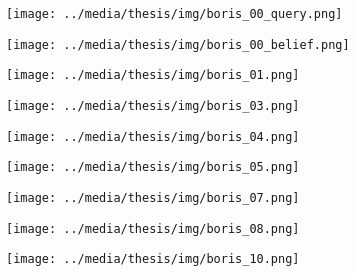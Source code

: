 \begin{figure}[!t]
  \centering
  \begin{subfigure}[t]{0.28\textwidth}
       \texttt{[image: ../media/thesis/img/boris\_00\_query.png]}
       \caption{}\label{fig:07:boris_irene_01}
  \end{subfigure} 
  \quad
  \begin{subfigure}[t]{0.28\textwidth}
     \texttt{[image: ../media/thesis/img/boris\_00\_belief.png]}
     \caption{}\label{fig:07:boris_irene_02}
  \end{subfigure}
  \quad
  \begin{subfigure}[t]{0.28\textwidth}
     \texttt{[image: ../media/thesis/img/boris\_01.png]}
     \caption{}\label{fig:07:boris_irene_03}
  \end{subfigure}
\vspace{2mm}

 \begin{subfigure}[t]{0.28\textwidth}
       \texttt{[image: ../media/thesis/img/boris\_03.png]}
       \caption{}\label{fig:07:rboris_irene_04}
  \end{subfigure} 
  \quad
  \begin{subfigure}[t]{0.28\textwidth}
     \texttt{[image: ../media/thesis/img/boris\_04.png]}
     \caption{}\label{fig:07:rboris_irene_05}
  \end{subfigure}
  \quad
  \begin{subfigure}[t]{0.28\textwidth}
     \texttt{[image: ../media/thesis/img/boris\_05.png]}
     \caption{}\label{fig:07:boris_irene_06}
  \end{subfigure}
\vspace{2mm}

 \begin{subfigure}[t]{0.28\textwidth}
       \texttt{[image: ../media/thesis/img/boris\_07.png]}
       \caption{}\label{fig:07:boris_irene_07}
  \end{subfigure} 
  \quad
  \begin{subfigure}[t]{0.28\textwidth}
     \texttt{[image: ../media/thesis/img/boris\_08.png]}
     \caption{}\label{fig:07:boris_irene_08}
  \end{subfigure}
  \quad
  \begin{subfigure}[t]{0.28\textwidth}
     \texttt{[image: ../media/thesis/img/boris\_10.png]}
     \caption{}\label{fig:07:boris_irene_10}
  \end{subfigure}
\vspace{2mm}


\end{figure}
